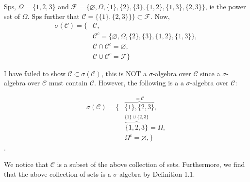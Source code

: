 \documentclass[letterpaper,12pt,titlepage,oneside,final]{book}
\begin{document}




Sps, $\Omega = \{1,2,3\}$ and $\mathcal{F} = \{\varnothing, \Omega, \{1\}, \{2\}, \{3\}, \{1,2\}, \{1,3\}, \{2,3\}\}$, ie the power set of $\Omega$. Sps further that $\mathcal{C} = \{\{1\}, \{2,3\}\}\} \subset \mathcal{F}$.
Now, 
\begin{align*}
\sigma(\mathcal{C}) = \{&\mathcal{C}, \\
						&\mathcal{C}^{c} =\{ \varnothing, \Omega, \{2\}, \{3\}, \{1,2\}, \{1,3\}  \}, \\
						&\mathcal{C} \cap \mathcal{C}^{c} = \varnothing, \\
						&\mathcal{C} \cup \mathcal{C}^{c} = \mathcal{F} \}
\end{align*}

I have failed to show $\mathcal{C} \subset \sigma(\mathcal{C}) $, this is NOT a  $\sigma$-algebra over $\mathcal{C} $ since a $\sigma$-algebra over $\mathcal{C} $ must contain $\mathcal{C}$. However, the following is a a $\sigma$-algebra over $\mathcal{C}$:


\begin{align*}
\sigma(\mathcal{C}) = \{&\overbrace{\{1\}, \{2,3\}}^{ = \mathcal{C} }, \\
						&\overbrace{\{1, 2,3\}}^{{\{1\} \cup \{2,3\}}  } = \Omega, \\
						& \Omega^{c} = \varnothing, \}
\end{align*}.

We notice that  $\mathcal{C}$ is a subset of the above collection of sets. Furthermore, we find that the above collection of sets is a $\sigma$-algebra by Definition 1.1.
\end{document}
